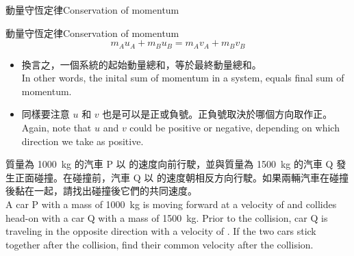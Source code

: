 \documentclass[13pt]{beamer}
\begin{document}
\begin{frame}{動量守恆定律Conservation of momentum}

    \begin{alertblock}
        {動量守恆定律Conservation of momentum}
        \begin{equation}
            m_Au_A+m_Bu_B=m_Av_A+m_Bv_B
        \end{equation}
    \end{alertblock}
    \begin{itemize}
        \item 換言之，一個系統的起始動量總和，等於最終動量總和。\\In other words, the inital sum of momentum in a system, equals final sum of momentum.
        \item 同樣要注意 $u$ 和 $v$ 也是可以是正或負號。正負號取決於哪個方向取作正。\\Again, note that $u$ and $v$ could be positive or negative, depending on which direction we take as positive.
    \end{itemize}
\end{frame}

\begin{eg}
    質量為 \qty{1000}{kg} 的汽車 P 以  的速度向前行駛，並與質量為 \qty{1500}{kg} 的汽車 Q 發生正面碰撞。在碰撞前，汽車 Q 以  的速度朝相反方向行駛。如果兩輛汽車在碰撞後黏在一起，請找出碰撞後它們的共同速度。\\A car P with a mass of \qty{1000}{kg} is moving forward at a velocity of  and collides head-on with a car Q with a mass of \qty{1500}{kg}. Prior to the collision, car Q is traveling in the opposite direction with a velocity of . If the two cars stick together after the collision, find their common velocity after the collision.
\end{eg}

\end{document}

